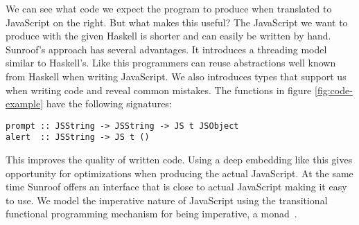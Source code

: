 We can see what code we expect the program to produce when 
translated to JavaScript on the right. But what makes 
this useful? The JavaScript we want to produce with the given
Haskell is shorter and can easily be written by hand.
Sunroof's approach has several advantages. It introduces a 
threading model similar
to Haskell's. Like this programmers can reuse abstractions
well known from Haskell when writing JavaScript.
We also introduces types that support us when 
writing code and reveal common mistakes. The functions
in figure \ref{fig:code-example} have the following signatures:
\begin{verbatim}
prompt :: JSString -> JSString -> JS t JSObject
alert  :: JSString -> JS t ()
\end{verbatim}
This improves the quality of written code.
Using a deep embedding like this gives opportunity 
for optimizations when producing the actual JavaScript.
At the same time Sunroof offers an interface that is 
close to actual JavaScript making it easy to use.
We model the imperative nature of JavaScript
using the transitional functional programming 
mechanism for being imperative, a monad~\cite{Moggi:91:ComputationMonads}.


